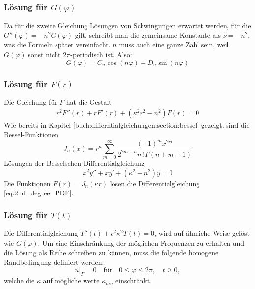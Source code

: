 \subsubsection{Lösung für $G(\varphi)$\label{subsub:lösung_G}}
Da für die zweite Gleichung Lösungen von Schwingungen erwartet werden, für die $G''(\varphi)=-n^2 G(\varphi)$ gilt, schreibt man die gemeinsame Konstante als $\nu=-n^2$, was die Formeln später vereinfacht. $n$ muss auch eine ganze Zahl sein, weil  $G(\varphi)$ sonst nicht $2\pi$-periodisch ist. Also:
\begin{equation*}
 G(\varphi) = C_n \cos(n\varphi) + D_n \sin(n\varphi)
 \label{eq:cos_sin_überlagerung}
\end{equation*}

\subsubsection{Lösung für $F(r)$\label{subsub:lösung_F}}
Die Gleichung für $F$ hat die Gestalt
\begin{align}
	r^2F''(r) + rF'(r) + (\kappa^2 r^2 - n^2)F(r) = 0 
	\label{eq:2nd_degree_PDE}
\end{align}
Wie bereits in Kapitel \ref{buch:differntialgleichungen:section:bessel} gezeigt, sind die Bessel-Funktionen
%
\begin{equation*}
	J_{n}(x) = r^n \displaystyle\sum_{m=0}^{\infty} \frac{(-1)^m x^{2m}}{2^{2m+n}m! \Gamma (n + m+1)}
\end{equation*}
Lösungen der Besselschen Differentialgleichung
%
\begin{equation*}
	x^2 y'' + xy' + (\kappa^2 - n^2)y = 0
\end{equation*}
Die Funktionen $F(r) = J_n(\kappa r)$ lösen die Differentialgleichung \eqref{eq:2nd_degree_PDE}.

\subsubsection{Lösung für $T(t)$\label{subsub:lösung_T}}
Die Differentialgleichung $T''(t) + c^2\kappa^2T(t) = 0$, wird auf ähnliche Weise gelöst wie $G(\varphi)$. Um eine Einschränkung der möglichen Frequenzen zu erhalten und die Lösung als Reihe schreiben zu können, muss die folgende homogene Randbedingung definiert werden: 
\begin{equation*}
	u\big|_{\Gamma} = 0 \quad \text{für} \quad 0 \leq \varphi \leq 2\pi,\quad t \geq 0,
\end{equation*}
welche die $\kappa$ auf mögliche werte $\kappa_{mn}$ einschränkt.
